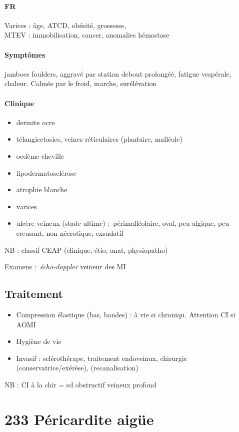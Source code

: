 \documentclass{article}
\begin{document}
\paragraph{FR} Varices : âge, ATCD, obésité, grossesse, \female\\
MTEV : immobilisation, cancer, anomalies hémostase

\paragraph{Symptômes} jamboes foulders, aggravé par station debout prolongéé,
fatigue vespérale, chaleur. Calmée par le froid, marche, surélévation

\paragraph{Clinique}
\begin{itemize}
  \item dermite ocre
  \item télangiectasies, veines réticulaires (plantaire, malléole)
  \item oedème cheville
  \item lipodermatosclérose
  \item atrophie blanche
  \item varices
  \item ulcère veineux (stade ultime) : périmalléolaire, oval, peu algique, peu
    creusant, non nécrotique, exsudatif
\end{itemize}
NB : classif CEAP (clinique, étio, anat, physiopatho)

Examens : \textit{écho-doppler}  veineur des MI

\subsection{Traitement}
\begin{itemize}
  \item Compression élastique (bas, bandes) : à vie si chroniqu. Attention CI si AOMI
  \item Hygiène de vie
  \item Invasif : sclérothérape, traitement endoveinux, chirurgie (conservatrice/exérèse), (recanalisation)
\end{itemize}
NB : CI à la chir = sd obstructif veineux profond

\section{233 Péricardite aigüe}%
\label{sec:233_pericardite_aigue}
\end{document}

